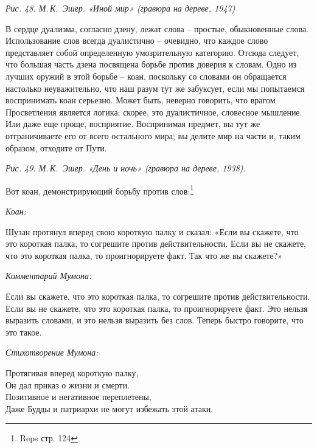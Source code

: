 \documentclass[../main.tex]{subfiles}
\begin{document}
\emph{Рис. 48. М.\,К.~Эшер. «Иной мир» (гравюра на дереве, 1947)}

В сердце дуализма, согласно дзену, лежат слова \--- простые, обыкновенные слова. Использование слов всегда дуалистично \--- очевидно, что каждое слово представляет собой определенную умозрительную категорию. Отсюда следует, что большая часть дзена посвящена борьбе против доверия к словам. Одно из лучших оружий в этой борьбе \--- коан, поскольку со словами он обращается настолько неуважительно, что наш разум тут же забуксует, если мы попытаемся воспринимать коан серьезно. Может быть, неверно говорить, что врагом Просветления является логика; скорее, это дуалистичное, словесное мышление. Или даже еще проще, восприятие. Воспринимая предмет, вы тут же отграничиваете его от всего остального мира; вы делите мир на части и, таким образом, отходите от Пути.

\emph{Рис. 49. М.\,К.~Эшер. «День и ночь» (гравюра на дереве, 1938).}

Вот коан, демонстрирующий борьбу против слов:\footnote{Reps стр. 124}

\begin{koan}
    \emph{\normalsize Коан:}
    \vspace{2pt}

    Шузан протянул вперед свою короткую палку и сказал: «Если вы скажете, что это короткая палка, то согрешите против действительности. Если вы не скажете, что это короткая палка, то проигнорируете факт. Так что же вы скажете?»
\end{koan}

\begin{koan}
    \emph{\normalsize Комментарий Мумона:}
    \vspace{2pt}

    Если вы скажете, что это короткая палка, то согрешите против действительности. Если вы не скажете, что это короткая палка, то проигнорируете факт. Это нельзя выразить словами, и это нельзя выразить без слов. Теперь быстро говорите, что это такое.
\end{koan}

\begin{koan}
    \emph{\normalsize Стихотворение Мумона:}

    \begin{mumonverse}
        Протягивая вперед короткую палку, \\
        Он дал приказ о жизни и смерти. \\
        Позитивное и негативное переплетены, \\
        Даже Будды и патриархи не могут избежать этой атаки.
    \end{mumonverse}
\end{koan}
\end{document}
